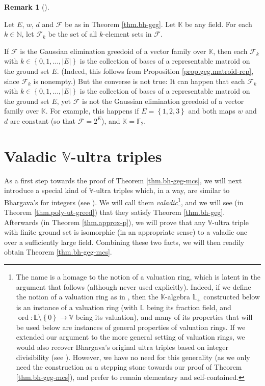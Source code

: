 \documentclass[numbers=enddot,12pt,final,onecolumn,notitlepage]{scrartcl}%
\theoremstyle{definition}
\newtheorem{remk}[theo]{Remark}
\newenvironment{remark}[1][]
{\begin{remk}[#1]\begin{leftbar}}
{\end{leftbar}\end{remk}}
\theoremstyle{plainsl}
\begin{document}
\begin{remark}
Let $E$, $w$, $d$ and $\mathcal{F}$ be as in Theorem \ref{thm.bh-geg}. Let
$\mathbb{K}$ be any field. For each $k\in\mathbb{N}$, let $\mathcal{F}_{k}$ be
the set of all $k$-element sets in $\mathcal{F}$.

If $\mathcal{F}$ is the Gaussian elimination greedoid of a vector family over
$\mathbb{K}$, then each $\mathcal{F}_{k}$ with $k\in\left\{  0,1,\ldots
,\left\vert E\right\vert \right\}  $ is the collection of bases of a
representable matroid on the ground set $E$. (Indeed, this follows from
Proposition \ref{prop.geg.matroid-rep}, since $\mathcal{F}_{k}$ is nonempty.)
But the converse is not true: It can happen that each $\mathcal{F}_{k}$ with
$k\in\left\{  0,1,\ldots,\left\vert E\right\vert \right\}  $ is the collection
of bases of a representable matroid on the ground set $E$, yet $\mathcal{F}$
is not the Gaussian elimination greedoid of a vector family over $\mathbb{K}$.
For example, this happens if $E=\left\{  1,2,3\right\}  $ and both maps $w$
and $d$ are constant (so that $\mathcal{F}=2^{E}$), and $\mathbb{K}%
=\mathbb{F}_{2}$.
\end{remark}


\section{\label{sect.p-adic}Valadic $\mathbb{V}$-ultra triples}

As a first step towards the proof of Theorem \ref{thm.bh-geg-mcs}, we will
next introduce a special kind of $\mathbb{V}$-ultra triples which, in a way,
are similar to Bhargava's for integers (see \cite[Example 2.5 and
\S 9]{GriPet19}). We will call them \textit{valadic}\footnote{The name is a
homage to the notion of a valuation ring, which is latent in the argument that
follows (although never used explicitly). Indeed, if we define the notion of a
valuation ring as in \cite[Exercise 11.1]{Eisenb95}, then the $\mathbb{K}%
$-algebra $\mathbb{L}_{+}$ constructed below is an instance of a valuation
ring (with $\mathbb{L}$ being its fraction field, and $\operatorname*{ord}%
:\mathbb{L}\setminus\left\{  0\right\}  \rightarrow\mathbb{V}$ being its
valuation), and many of its properties that will be used below are instances
of general properties of valuation rings. If we extended our argument to the
more general setting of valuation rings, we would also recover Bhargava's
original ultra triples based on integer divisibility (see \cite[Example 2.5
and \S 9]{GriPet19}). However, we have no need for this generality (as we only
need the construction as a stepping stone towards our proof of Theorem
\ref{thm.bh-geg-mcs}), and prefer to remain elementary and self-contained.},
and we will see (in Theorem \ref{thm.poly-ut-greed}) that they satisfy Theorem
\ref{thm.bh-geg}. Afterwards (in Theorem \ref{thm.approx-p}), we will prove
that any $\mathbb{V}$-ultra triple with finite ground set is isomorphic (in an
appropriate sense) to a valadic one over a sufficiently large field. Combining
these two facts, we will then readily obtain Theorem \ref{thm.bh-geg-mcs}.
\end{document}
